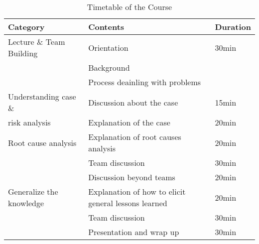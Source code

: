 \begin{table*}[!t]
\label{table:timetable}
\caption{Timetable of the Course}
\begin{center}
\begin{tabular}{|l|l|l|}\hline
Category				& Contents & Duration \\ \hline \hline
Lecture	\& Team Building	& Orientation & 30min \\
						& Background & \\ 
						& Process deainling with problems & \\ \hline

Understanding case \&   & Discussion about the case & 15min \\
risk analysis  			& Explanation of the case   & 20min \\ \hline

Root cause analysis		& Explanation of root causes analysis & 20min \\
						& Team discussion & 30min \\
						& Discussion beyond teams & 20min \\ \hline
Generalize the knowledge & Explanation of how to elicit general lessons learned & 20min \\
& Team discussion & 30min \\
& Presentation and wrap up & 30min \\ \hline
\end{tabular}
\end{center}
\end{table*}

